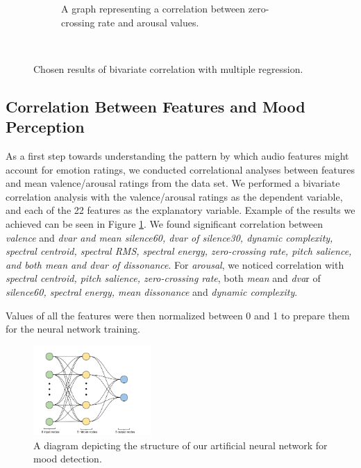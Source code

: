 \begin{figure}
\begin{subfigure}[b]{0.48\textwidth}
                \caption{A graph representing a correlation between zero-crossing rate and arousal values.}
        \end{subfigure}
          \caption{Chosen results of bivariate correlation with multiple regression.}
        ~ %
                        \label{fig:bivariateNN}

\end{figure}



\subsection{Correlation Between Features and Mood Perception}

As a first step towards understanding the pattern by which audio features might account for emotion ratings, we conducted correlational analyses between features and mean valence/arousal ratings from the data set. We performed a bivariate correlation analysis with the valence/arousal ratings as the dependent variable, and each of the 22 features as the explanatory variable. Example of the results we achieved can be seen in Figure \ref{fig:bivariateNN}. We found significant correlation between \textit{valence} and \textit{dvar and mean silence60, dvar of silence30, dynamic complexity, spectral centroid, spectral RMS, spectral energy, zero-crossing rate, pitch salience, and both mean and dvar of dissonance}. For \textit{arousal}, we noticed correlation with \textit{spectral centroid, pitch salience, zero-crossing rate}, both \textit{mean} and \textit{dva}r of  \textit{silence60, spectral energy, mean dissonance} and \textit{dynamic complexity}. 

Values of all the features were then normalized between 0 and 1 to prepare them for the neural network training. 



\begin{figure}
  \vspace{-30pt}
  \begin{center}
    \includegraphics[width=0.4\textwidth]{Figures/myANN}
  \end{center}
  \caption{A diagram depicting the structure of our artificial neural network for mood detection.}
\label{finalnetwork}
\end{figure}


